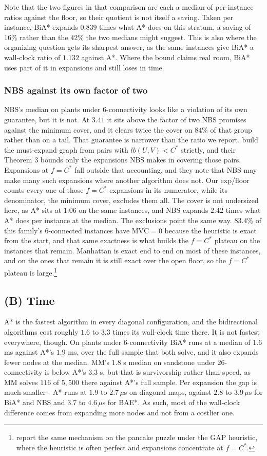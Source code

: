 \documentclass[letterpaper]{article} %
\begin{document}
Note that the two figures in that comparison are each a median of per-instance ratios against the floor, so their quotient is not itself a saving. Taken per instance, BiA* expands $0.839$ times what A* does on this stratum, a saving of $16\%$ rather than the $42\%$ the two medians might suggest. This is also where the organizing question gets its sharpest answer, as the same instances give BiA* a wall-clock ratio of $1.132$ against A*. Where the bound claims real room, BiA* uses part of it in expansions and still loses in time.

\subsubsection{NBS against its own factor of two}
NBS's median on plants under 6-connectivity looks like a violation of its own guarantee, but it is not. At $3.41$ it sits above the factor of two NBS promises against the minimum cover, and it clears twice the cover on $84\%$ of that group rather than on a tail. That guarantee is narrower than the ratio we report. \citet{chen2017nbs} build the must-expand graph from pairs with $lb(U,V)<C^*$ strictly, and their Theorem 3 bounds only the expansions NBS makes in covering those pairs. Expansions at $f=C^*$ fall outside that accounting, and they note that NBS may make many such expansions where another algorithm does not. Our exp/floor counts every one of those $f=C^*$ expansions in its numerator, while its denominator, the minimum cover, excludes them all. The cover is not undersized here, as A* sits at $1.06$ on the same instances, and NBS expands $2.42$ times what A* does per instance at the median. The exclusions point the same way. $83.4\%$ of this family's 6-connected instances have $\text{MVC}=0$ because the heuristic is exact from the start, and that same exactness is what builds the $f=C^*$ plateau on the instances that remain. Manhattan is exact end to end on most of these instances, and on the ones that remain it is still exact over the open floor, so the $f=C^*$ plateau is large.\footnote{\citet{chen2017nbs} report the same mechanism on the pancake puzzle under the GAP heuristic, where the heuristic is often perfect and expansions concentrate at $f=C^*$.}

\subsection{(B) Time}
A* is the fastest algorithm in every diagonal configuration, and the bidirectional algorithms cost roughly $1.6$ to $3.3$ times its wall-clock time there. It is not fastest everywhere, though. On plants under 6-connectivity BiA* runs at a median of $1.6$ ms against A*'s $1.9$ ms, over the full sample that both solve, and it also expands fewer nodes at the median. MM's $1.8$ s median on sandstone under 26-connectivity is below A*'s $3.3$ s, but that is survivorship rather than speed, as MM solves $116$ of $5{,}500$ there against A*'s full sample. Per expansion the gap is much smaller - A* runs at $1.9$ to $2.7\,\mu$s on diagonal maps, against $2.8$ to $3.9\,\mu$s for BiA* and NBS and $3.7$ to $4.6\,\mu$s for BAE*. As such, most of the wall-clock difference comes from expanding more nodes and not from a costlier one.
\end{document}
